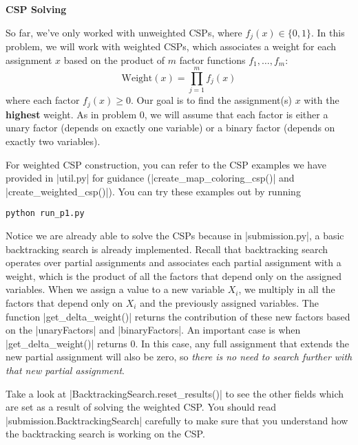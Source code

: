 \item {\bf CSP Solving}

So far, we've only worked with unweighted CSPs, where $f_j(x)\in\{0,1\}$. In
this problem, we will work with weighted CSPs, which associates a weight for
each assignment $x$ based on the product of $m$ factor functions $f_1, \dots,
f_m$:
\[\text{Weight}(x) = \prod^m_{j=1}f_j(x)\]
where each factor $f_j(x)\geq 0$. Our goal is to find the assignment(s) $x$ with
the {\bf highest} weight. As in problem 0, we will assume that each factor is
either a unary factor (depends on exactly one variable) or a binary factor
(depends on exactly two variables).

For weighted CSP construction, you can refer to the CSP examples we have
provided in |util.py| for guidance (|create_map_coloring_csp()| and
|create_weighted_csp()|). You can try these examples out by running

\begin{lstlisting}
python run_p1.py
\end{lstlisting}

Notice we are already able to solve the CSPs because in |submission.py|, a basic
backtracking search is already implemented. Recall that backtracking search
operates over partial assignments and associates each partial assignment with a
weight, which is the product of all the factors that depend only on the assigned
variables. When we assign a value to a new variable $X_i$, we multiply in all
the factors that depend only on $X_i$ and the previously assigned variables. The
function |get_delta_weight()| returns the contribution of these new factors
based on the |unaryFactors| and |binaryFactors|. An important case is when
|get_delta_weight()| returns 0. In this case, any full assignment that extends
the new partial assignment will also be zero, so {\em there is no need to search
further with that new partial assignment}.

Take a look at |BacktrackingSearch.reset_results()| to see the other fields
which are set as a result of solving the weighted CSP. You should read
|submission.BacktrackingSearch| carefully to make sure that you understand how
the backtracking search is working on the CSP.

\begin{enumerate}

  

  

  

\end{enumerate}
